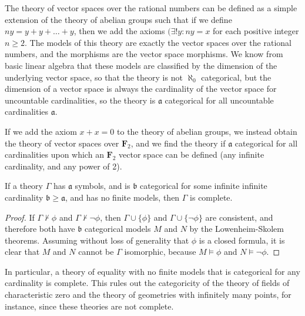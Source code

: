 \begin{example}
    The theory of vector spaces over the rational numbers can be defined as a simple extension of the theory of abelian groups such that if we define $ny = y + y + \dots + y$, then we add the axioms $(\exists ! y: ny = x$ for each positive integer $n \geq 2$. The models of this theory are exactly the vector spaces over the rational numbers, and the morphisms are the vector space morphisms. We know from basic linear algebra that these models are classified by the dimension of the underlying vector space, so that the theory is not $\aleph_0$ categorical, but the dimension of a vector space is always the cardinality of the vector space for uncountable cardinalities, so the theory is $\mathfrak{a}$ categorical for all uncountable cardinalities $\mathfrak{a}$.
\end{example}

\begin{example}
    If we add the axiom $x + x = 0$ to the theory of abelian groups, we instead obtain the theory of vector spaces over $\mathbf{F}_2$, and we find the theory if $\mathfrak{a}$ categorical for all cardinalities upon which an $\mathbf{F}_2$ vector space can be defined (any infinite cardinality, and any power of 2).
\end{example}

\begin{theorem}
    If a theory $\Gamma$ has $\mathfrak{a}$ symbols, and is $\mathfrak{b}$ categorical for some infinite infinite cardinality $\mathfrak{b} \geq \mathfrak{a}$, and has no finite models, then $\Gamma$ is complete.
\end{theorem}
\begin{proof}
    If $\Gamma \not \vdash \phi$ and $\Gamma \not \vdash \neg \phi$, then $\Gamma \cup \{ \phi \}$ and $\Gamma \cup \{ \neg \phi \}$ are consistent, and therefore both have $\mathfrak{b}$ categorical models $M$ and $N$ by the Lowenheim-Skolem theorems. Assuming without loss of generality that $\phi$ is a closed formula, it is clear that $M$ and $N$ cannot be $\Gamma$ isomorphic, because $M \vDash \phi$ and $N \vDash \neg \phi$.
\end{proof}

In particular, a theory of equality with no finite models that is categorical for any cardinality is complete. This rules out the categoricity of the theory of fields of characteristic zero and the theory of geometries with infinitely many points, for instance, since these theories are not complete.


